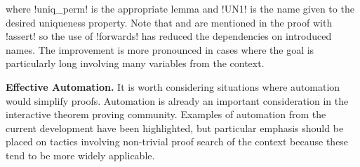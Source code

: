 where \coqe!uniq_perm! is the appropriate lemma and \coqe!UN1! is the name
given to the desired uniqueness property. Note that  and  are
mentioned in the proof with \coqe!assert! so the use of \coqe!forwards! has
reduced the dependencies on introduced names. The improvement is more
pronounced in cases where the goal is particularly long involving many
variables from the context.

\textbf{Effective Automation.} It is worth considering situations where
automation would simplify proofs. Automation is already an important
consideration in the interactive theorem proving community. Examples of
automation from the current development have been highlighted, but particular
emphasis should be placed on tactics involving non-trivial proof search of the
context because these tend to be more widely applicable.
